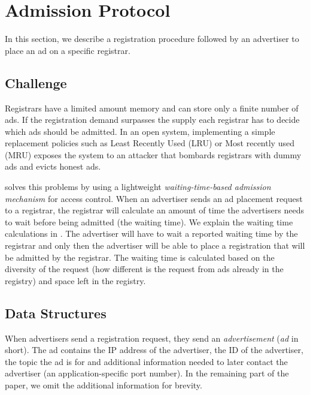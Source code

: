 \section{Admission Protocol}\label{sec:admission}
In this section, we describe a registration procedure followed by an advertiser to place an ad on a specific registrar.

\subsection{Challenge}
Registrars have a limited amount memory and can store only a finite number of ads. If the registration demand surpasses the supply each registrar has to decide which ads should be admitted. In an open system, implementing a simple replacement policies such as Least Recently Used (LRU) or Most recently used (MRU) exposes the system to an attacker that bombards registrars with dummy ads and evicts honest ads.

\sysname solves this problems by using a lightweight \textit{waiting-time-based admission mechanism} for access control. When an advertiser sends an ad placement request to a registrar, the registrar will calculate an amount of time the advertisers needs to wait before being admitted (\ie the waiting time). We explain the waiting time calculations in . The advertiser will have to wait a reported waiting time by the registrar and only then the advertiser will be able to place a registration that will be admitted by the registrar. The waiting time is calculated based on the diversity of the request (\ie how different is the request from ads already in the registry) and space left in the registry. 



\subsection{Data Structures}
When advertisers send a registration request, they send an \emph{advertisement} (\emph{ad} in short). The ad contains the IP address of the advertiser, the ID of the advertiser, the topic the ad is for and additional information needed to later contact the advertiser (\eg an application-specific port number). In the remaining part of the paper, we omit the additional information for brevity. 

